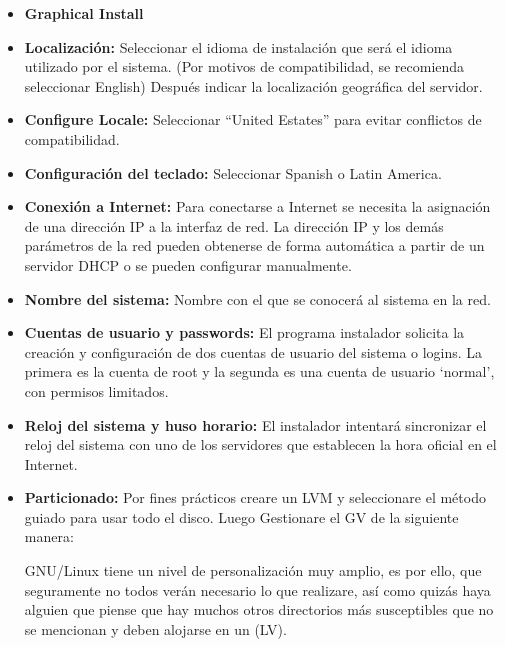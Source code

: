 		\begin{itemize}
			
			\item \textbf{Graphical Install}
			
			\item \textbf{Localización:} Seleccionar el idioma de instalación que será el idioma utilizado por el sistema. (Por motivos de compatibilidad, se recomienda seleccionar English) Después indicar la localización geográfica del servidor.
			
			\item \textbf{Configure Locale:} Seleccionar “United Estates” para evitar conflictos de compatibilidad.
			
			\item \textbf{Configuración del teclado:} Seleccionar Spanish o Latin America.
			
			\item \textbf{Conexión a Internet:} Para conectarse a Internet se necesita la asignación de una dirección IP a la interfaz de red. La dirección IP y los demás parámetros de la red pueden obtenerse de forma automática a partir de un servidor DHCP o se pueden configurar manualmente.
			
			\item \textbf{Nombre del sistema:} Nombre con el que se conocerá al sistema en la red.
			
			\item \textbf{Cuentas de usuario y passwords:} El programa instalador solicita la creación y configuración de dos cuentas de usuario del sistema o logins. La primera es la cuenta de root y la segunda es una cuenta de usuario ‘normal’, con permisos limitados.
			
			\item \textbf{Reloj del sistema y huso horario:} El instalador intentará sincronizar el reloj del sistema con uno de los servidores que establecen la hora oficial en el Internet.
			
			\item \textbf{Particionado:} Por fines prácticos creare un LVM y seleccionare el método guiado para usar todo el disco. Luego Gestionare el GV de la siguiente manera:
			
			GNU/Linux tiene un nivel de personalización muy amplio, es por ello, que seguramente no todos verán necesario lo que realizare, así como quizás haya alguien que piense que hay muchos otros directorios más susceptibles que no se mencionan y deben alojarse en un (LV).
			

\end{itemize}
